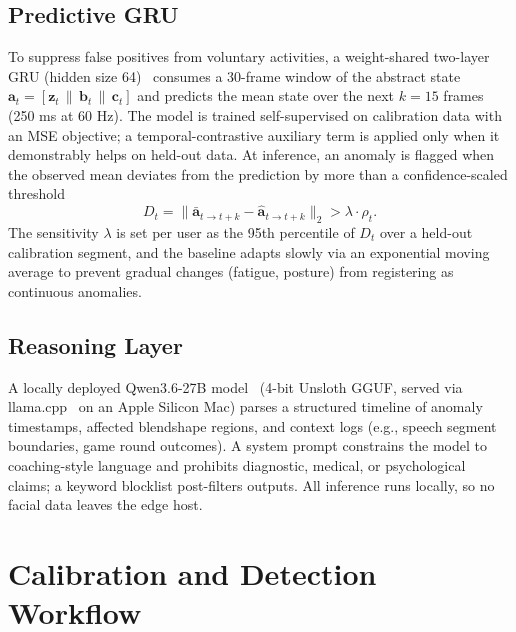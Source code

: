 \documentclass[sigconf]{acmart}
\begin{document}
\subsection{Predictive GRU}
To suppress false positives from voluntary activities, a weight-shared
two-layer GRU (hidden size 64)~\cite{cho2014gru} consumes a 30-frame window of
the abstract state $\mathbf{a}_t = [\mathbf{z}_t \,\|\, \mathbf{b}_t
\,\|\, \mathbf{c}_t]$ and predicts the mean state over the next $k = 15$
frames (250 ms at 60 Hz). The model is trained self-supervised on calibration
data with an MSE objective; a temporal-contrastive auxiliary term is applied
only when it demonstrably helps on held-out data. At inference, an anomaly is
flagged when the observed mean deviates from the prediction by more than a
confidence-scaled threshold
$$D_t = \|\bar{\mathbf{a}}_{t \to t+k} - \hat{\mathbf{a}}_{t \to t+k}\|_2
> \lambda \cdot \rho_t.$$
The sensitivity $\lambda$ is set per user as the 95th percentile of $D_t$ over
a held-out calibration segment, and the baseline adapts slowly via an
exponential moving average to prevent gradual changes (fatigue, posture) from
registering as continuous anomalies.

\subsection{Reasoning Layer}
\label{sec:llm}
A locally deployed Qwen3.6-27B model~\cite{qwen2026} (4-bit Unsloth GGUF,
served via llama.cpp~\cite{gerganov2023llamacpp} on an Apple Silicon Mac)
parses a structured timeline of anomaly timestamps, affected blendshape
regions, and context logs (e.g., speech segment boundaries, game round
outcomes). A system prompt constrains the model to coaching-style language and
prohibits diagnostic, medical, or psychological claims; a keyword blocklist
post-filters outputs. All inference runs locally, so no facial data leaves the
edge host.

\section{Calibration and Detection Workflow}
\label{sec:workflow}
\end{document}
